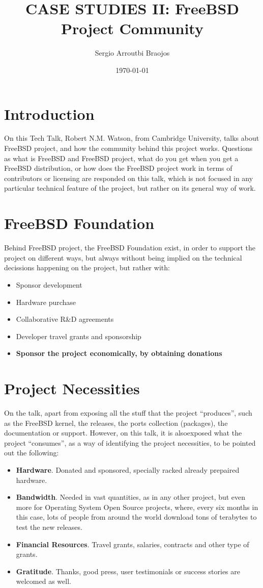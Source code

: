 \documentclass[11pt]{article}
\title{\textbf{CASE STUDIES II: FreeBSD Project Community}}
\author{Sergio Arroutbi Braojos}
\date{\today}
\begin{document}
\maketitle

\section{Introduction}
On this Tech Talk, Robert N.M. Watson, from Cambridge University, talks about FreeBSD project, and how the community behind this project works. Questions as what is FreeBSD and FreeBSD project, what do you get when you get a FreeBSD distribution, or how does the FreeBSD project work in terms of contributors or licensing are responded on this talk, which is not focused in any particular technical feature of the project, but rather on its general way of work.
\section{FreeBSD Foundation}
Behind FreeBSD project, the FreeBSD Foundation exist, in order to support the project on different ways, but always without being implied on the technical decissions happening on the project, but rather with:
\begin{itemize}\itemsep0pt
\item{Sponsor development}
\item{Hardware purchase}
\item{Collaborative R\&D agreements}
\item{Developer travel grants and sponsorship}
\item{\textbf{Sponsor the project economically, by obtaining donations}}
\end{itemize}
\section{Project Necessities}
On the talk, apart from exposing all the stuff that the project ``produces'', such as the FreeBSD kernel, the releases, the ports collection (packages), the documentation or support. However, on this talk, it is alsoexposed what the project ``consumes'', as a way of identifying the project necessities, to be pointed out the following:
\begin{itemize}\itemsep0pt
\item{\textbf{Hardware}}. Donated and sponsored, specially racked already prepaired hardware.
\item{\textbf{Bandwidth}}. Needed in vast quantities, as in any other project, but even more for Operating System Open Source projects, where, every six months in this case, lots of people from around the world download tons of terabytes to test the new releases.
\item{\textbf{Financial Resources}}. Travel grants, salaries, contracts and other type of grants.
\item{\textbf{Gratitude}}. Thanks, good press, user testimonials or success stories are welcomed as well.
\end{itemize}
\end{document}
